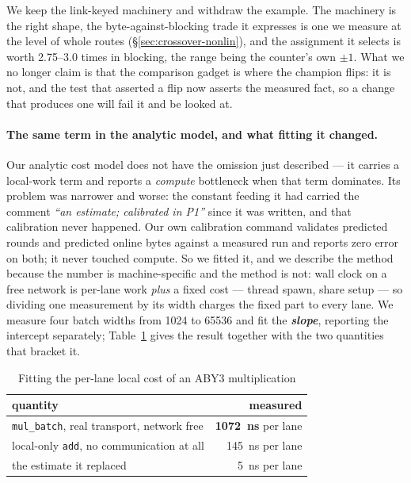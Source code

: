 \documentclass[11pt]{article}
\newcommand{\ib}[1]{\textbf{\emph{#1}}}
\newcommand{\bt}[1]{\texttt{#1}}
\begin{document}
We keep the link-keyed machinery and withdraw the example. The machinery is the right shape, the
byte-against-blocking trade it expresses is one we measure at the level of whole routes
(\S\ref{sec:crossover-nonlin}), and the assignment it selects is worth \numrange{2.75}{3.0} times in blocking, the range being the counter's own $\pm 1$.
What we no longer claim is that the comparison gadget is where the champion flips: it is not, and
the test that asserted a flip now asserts the measured fact, so a change that produces one will
fail it and be looked at.

\paragraph{The same term in the analytic model, and what fitting it changed.}
Our analytic cost model does not have the omission just described --- it carries a local-work term
and reports a \emph{compute} bottleneck when that term dominates. Its problem was narrower and
worse: the constant feeding it had carried the comment \emph{``an estimate; calibrated in P1''}
since it was written, and that calibration never happened. Our own calibration command validates
predicted rounds and predicted online bytes against a measured run and reports zero error on both;
it never touched compute. So we fitted it, and we describe the method because the number is
machine-specific and the method is not: wall clock on a free network is per-lane work \emph{plus} a
fixed cost --- thread spawn, share setup --- so dividing one measurement by its width charges the
fixed part to every lane. We measure four batch widths from \num{1024} to \num{65536} and fit the
\ib{slope}, reporting the intercept separately; Table~\ref{tab:localfit} gives the result together
with the two quantities that bracket it.

\begin{table}[htb]
\centering
\small
\begin{tabular}{@{}lr@{}}
\toprule
quantity & measured \\
\midrule
\bt{mul\_batch}, real transport, network free & \textbf{\SI{1072}{\nano\second}} per lane \\
local-only \bt{add}, no communication at all & \SI{145}{\nano\second} per lane \\
the estimate it replaced & \SI{5}{\nano\second} per lane \\
\bottomrule
\end{tabular}
\caption{Fitting the per-lane local cost of an ABY3 multiplication}
\label{tab:localfit}
\end{table}
\end{document}
